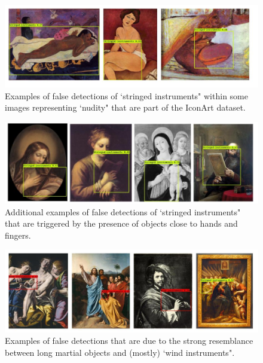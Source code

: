 \begin{figure}[ht!]
\centering
  \includegraphics[width=\linewidth]{./Images/Chapter05/false_positives_1}
  \caption{Examples of false detections of `stringed instruments" within some images representing `nudity" that are part of the IconArt dataset.}
  \label{fig:false_positives_1}
\end{figure}

\begin{figure}[ht!]
\centering
  \includegraphics[width=\linewidth]{./Images/Chapter05/false_positives_4}
  \caption{Additional examples of false detections of `stringed instruments" that are triggered by the presence of objects close to hands and fingers.}
  \label{fig:false_positives_4}
\end{figure}

\begin{figure}[ht!]
\centering
  \includegraphics[width=\linewidth]{./Images/Chapter05/false_positives_2}
  \caption{Examples of false detections that are due to the strong resemblance between long martial objects and (mostly) `wind instruments".}
  \label{fig:false_positives_2}
\end{figure}


